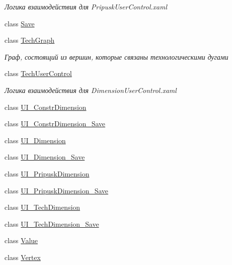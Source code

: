 \begin{DoxyCompactItemize}
\begin{DoxyCompactList}\small\item\em Логика взаимодействия для Pripusk\+User\+Control.\+xaml \end{DoxyCompactList}\item 
class \mbox{\hyperlink{class_dimension___chain_1_1_save}{Save}}
\item 
class \mbox{\hyperlink{class_dimension___chain_1_1_tech_graph}{Tech\+Graph}}
\begin{DoxyCompactList}\small\item\em Граф, состоящий из вершин, которые связаны технологическими дугами \end{DoxyCompactList}\item 
class \mbox{\hyperlink{class_dimension___chain_1_1_tech_user_control}{Tech\+User\+Control}}
\begin{DoxyCompactList}\small\item\em Логика взаимодействия для Dimension\+User\+Control.\+xaml \end{DoxyCompactList}\item 
class \mbox{\hyperlink{class_dimension___chain_1_1_u_i___constr_dimension}{U\+I\+\_\+\+Constr\+Dimension}}
\item 
class \mbox{\hyperlink{class_dimension___chain_1_1_u_i___constr_dimension___save}{U\+I\+\_\+\+Constr\+Dimension\+\_\+\+Save}}
\item 
class \mbox{\hyperlink{class_dimension___chain_1_1_u_i___dimension}{U\+I\+\_\+\+Dimension}}
\item 
class \mbox{\hyperlink{class_dimension___chain_1_1_u_i___dimension___save}{U\+I\+\_\+\+Dimension\+\_\+\+Save}}
\item 
class \mbox{\hyperlink{class_dimension___chain_1_1_u_i___pripusk_dimension}{U\+I\+\_\+\+Pripusk\+Dimension}}
\item 
class \mbox{\hyperlink{class_dimension___chain_1_1_u_i___pripusk_dimension___save}{U\+I\+\_\+\+Pripusk\+Dimension\+\_\+\+Save}}
\item 
class \mbox{\hyperlink{class_dimension___chain_1_1_u_i___tech_dimension}{U\+I\+\_\+\+Tech\+Dimension}}
\item 
class \mbox{\hyperlink{class_dimension___chain_1_1_u_i___tech_dimension___save}{U\+I\+\_\+\+Tech\+Dimension\+\_\+\+Save}}
\item 
class \mbox{\hyperlink{class_dimension___chain_1_1_value}{Value}}
\item 
class \mbox{\hyperlink{class_dimension___chain_1_1_vertex}{Vertex}}
\end{DoxyCompactItemize}
